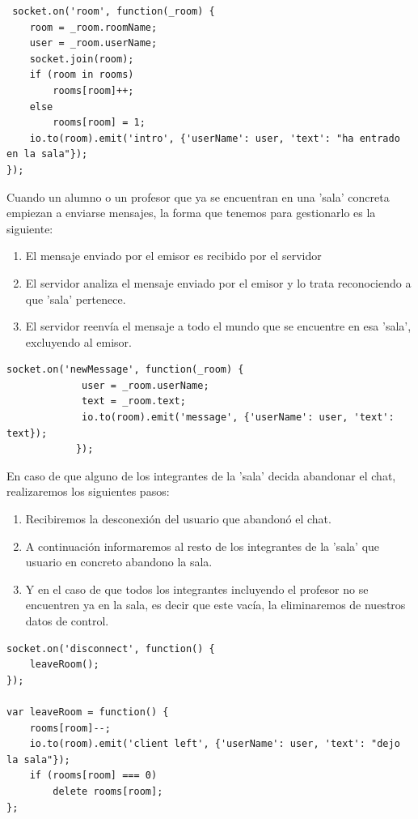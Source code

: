 \begin{itemize}
\begin{lstlisting}
 socket.on('room', function(_room) {
    room = _room.roomName;
	user = _room.userName;
    socket.join(room);
    if (room in rooms)
        rooms[room]++;
    else
        rooms[room] = 1;
    io.to(room).emit('intro', {'userName': user, 'text': "ha entrado en la sala"});
});

\end{lstlisting}

Cuando un alumno o un profesor que ya se encuentran en una 'sala' concreta empiezan a enviarse mensajes, la forma que tenemos para gestionarlo es la siguiente:

\begin{enumerate}
    \item El mensaje enviado por el emisor es recibido por el servidor

    \item El servidor analiza el mensaje enviado por el emisor y lo trata reconociendo a que 'sala' pertenece.

    \item El servidor reenvía el mensaje a todo el mundo que se encuentre en esa 'sala', excluyendo al emisor.
\end{enumerate}

\begin{lstlisting}
socket.on('newMessage', function(_room) {
			 user = _room.userName;
			 text = _room.text;
			 io.to(room).emit('message', {'userName': user, 'text': text});
			});
\end{lstlisting}

En caso de que alguno de los integrantes de la 'sala' decida abandonar el chat, realizaremos los siguientes pasos:

\begin{enumerate}
    \item Recibiremos la desconexión del usuario que abandonó el chat.

    \item A continuación informaremos al resto de los integrantes de la 'sala' que usuario en concreto abandono la sala.

    \item Y en el caso de que todos los integrantes incluyendo el profesor no se encuentren ya en la sala, es decir que este vacía, la eliminaremos de nuestros datos de control.

\end{enumerate}

\begin{lstlisting}
socket.on('disconnect', function() {
    leaveRoom();
});

var leaveRoom = function() {
    rooms[room]--;
    io.to(room).emit('client left', {'userName': user, 'text': "dejo la sala"});
    if (rooms[room] === 0)
        delete rooms[room];
};
\end{lstlisting}
\end{itemize}

